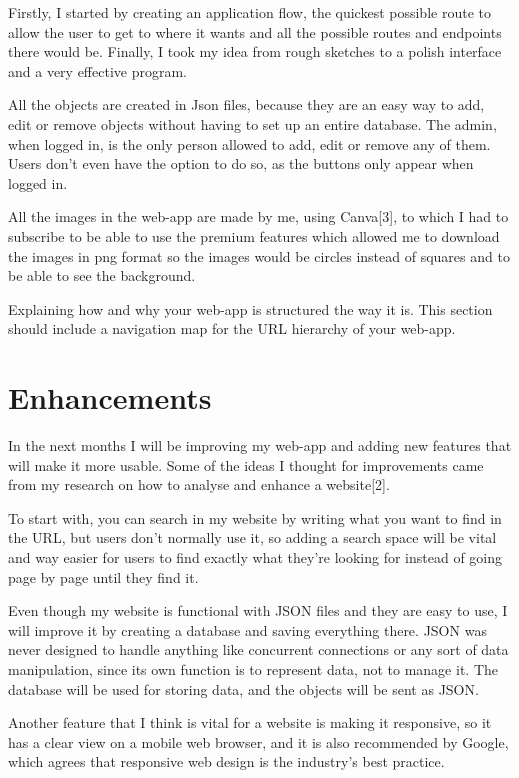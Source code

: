 \documentclass[10pt, a4paper]{article}
\begin{document}
    Firstly, I started by creating an application flow, the quickest possible route to allow the user to get to where it wants and all the possible routes and endpoints there would be. Finally, I took my idea from rough sketches to a polish interface and a very effective program.

    All the objects are created in Json files, because they are an easy way to add, edit or remove objects without having to set up an entire database. The admin, when logged in, is the only person allowed to add, edit or remove any of them. Users don't even have the option to do so, as the buttons only appear when logged in.

    All the images in the web-app are made by me, using Canva[3], to which I had to subscribe to be able to use the premium features which allowed me to download the images in png format so the images would be circles instead of squares and to be able to see the background.

    Explaining how and why your web-app is structured the way it is. This section should include a navigation map for the URL hierarchy of your web-app.

    \section{Enhancements}

    In the next months I will be improving my web-app and adding new features that will make it more usable. Some of the ideas I thought for improvements came from my research on how to analyse and enhance a website[2].

    To start with, you can search in my website by writing what you want to find in the URL, but users don't normally use it, so adding a search space will be vital and way easier for users to find exactly what they're looking for instead of going page by page until they find it.

    Even though my website is functional with JSON files and they are easy to use, I will improve it by creating a database and saving everything there. JSON was never designed to handle anything like concurrent connections or any sort of data manipulation, since its own function is to represent data, not to manage it. The database will be used for storing data, and the objects will be sent as JSON.

    Another feature that I think is vital for a website is making it responsive, so it has a clear view on a mobile web browser, and it is also recommended by Google, which agrees that responsive web design is the industry's best practice.
\end{document}
